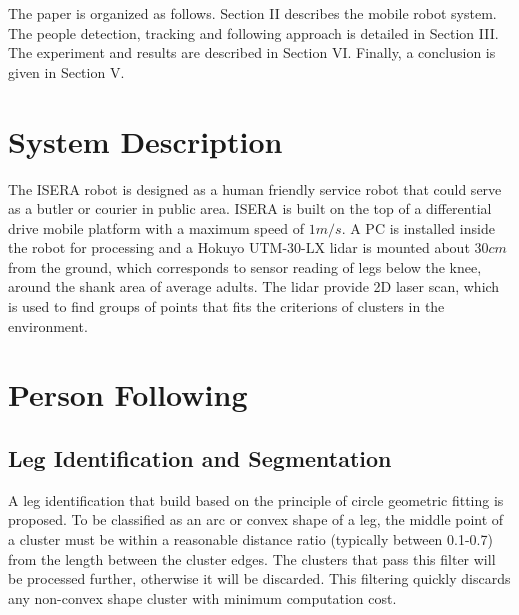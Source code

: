 \documentclass[10 pt,a4paper,conference]{IEEEtran}
\begin{document}
The paper is organized as follows. Section II describes the mobile robot
system. The people detection, tracking and following approach is
detailed in Section III. The experiment and results are described in
Section VI. Finally, a conclusion is given in Section V.

\section{System Description}\label{system-description}

The ISERA robot is designed as a human friendly service robot that could
serve as a butler or courier in public area. ISERA is built on the top
of a differential drive mobile platform with a maximum speed of
\(1m/s\). A PC is installed inside the robot for processing and a Hokuyo
UTM-30-LX lidar is mounted about \(30cm\) from the ground, which
corresponds to sensor reading of legs below the knee, around the shank
area of average adults. The lidar provide 2D laser scan, which is used to find groups of points that fits the criterions of clusters in the environment.

\section{Person Following}\label{person-following}

\subsection{Leg Identification and Segmentation}\label{leg-identification}



A leg identification that build based on the principle of circle
geometric fitting is proposed. To be classified as an arc or convex shape of a leg, the middle point of
a cluster must be within a reasonable distance ratio (typically between
0.1-0.7) from the length between the cluster edges. The clusters that
pass this filter will be processed further, otherwise it will be
discarded. This filtering quickly discards any non-convex shape cluster
with minimum computation cost.
\end{document}
